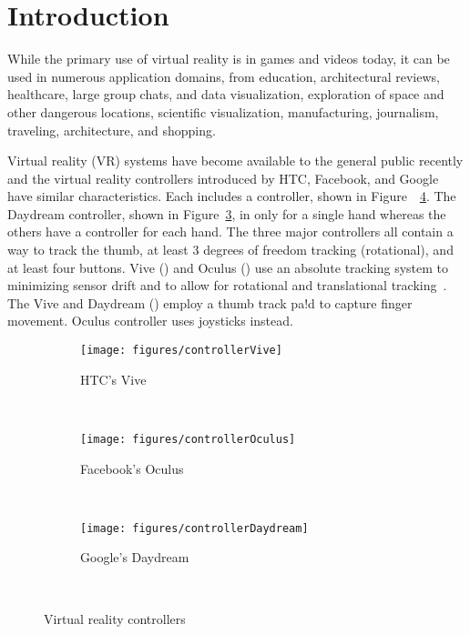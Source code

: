 \section{Introduction}

While the primary use of virtual reality is in games and videos today, it can be used in numerous application domains, from education, architectural reviews, healthcare, large group chats, and data visualization, exploration of space and other dangerous locations, scientific visualization, manufacturing, journalism, traveling, architecture, and shopping.  

Virtual reality (VR) systems have become available to the general public recently and the virtual reality controllers introduced by HTC, Facebook, and Google have similar characteristics. 
Each includes a controller, shown in Figure~~\ref{fig:controllers}.
The Daydream controller, shown in Figure~\ref{fig:controllerDaydream}, in only for a single hand whereas the others have a controller for each hand.  The three major controllers all contain a way to track the thumb, at least 3 degrees of freedom tracking  (rotational), and at least four buttons.
Vive () and Oculus () use an absolute tracking system to minimizing sensor drift and to allow for rotational and translational tracking~\cite{hilfert2016low}.  The Vive and Daydream () employ a thumb track pa!d to capture finger movement.  Oculus controller uses joysticks instead. 

\begin{figure}
  \centering
	\begin{subfigure}{.4\columnwidth}
  \texttt{[image: figures/controllerVive]}
  \caption{HTC's Vive }\label{fig:controllerVive}
  \end{subfigure}
  \\
  \begin{subfigure}{.4\columnwidth}
  \texttt{[image: figures/controllerOculus]}
  \caption{Facebook's Oculus}\label{fig:controllerOculus}
  \end{subfigure}
  \\
  \begin{subfigure}{.4\columnwidth}
  \texttt{[image: figures/controllerDaydream]}
  \caption{Google's Daydream}\label{fig:controllerDaydream}
  \end{subfigure}
  \caption{Virtual reality controllers}
~\label{fig:controllers}

\end{figure}

